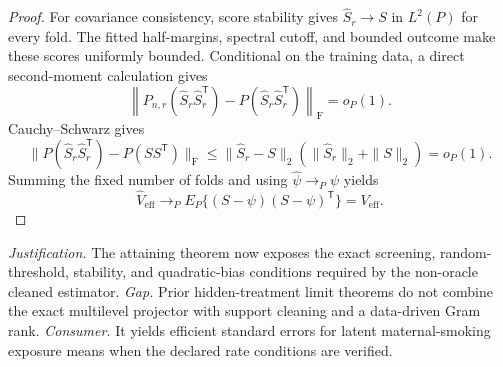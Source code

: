 \documentclass{article}
\begin{document}
\begin{proof}
For covariance consistency, score stability gives \(\widehat S_r\to S\) in \(L^2(P)\) for every fold.  The fitted half-margins, spectral cutoff, and bounded outcome make these scores uniformly bounded.  Conditional on the training data, a direct second-moment calculation gives
\[
 \left\|P_{n,r}(\widehat S_r\widehat S_r^{\mathsf T})
 -P(\widehat S_r\widehat S_r^{\mathsf T})\right\|_{\mathrm F}=o_P(1). \tag{62}
\]
Cauchy--Schwarz gives
\[
 \|P(\widehat S_r\widehat S_r^{\mathsf T})-P(SS^{\mathsf T})\|_{\mathrm F}
 \leq\|\widehat S_r-S\|_2(\|\widehat S_r\|_2+\|S\|_2)=o_P(1). \tag{63}
\]
Summing the fixed number of folds and using \(\widehat\psi\to_P\psi\) yields
\[
 \widehat V_{\mathrm{eff}}
 \to_P E_P\{(S-\psi)(S-\psi)^{\mathsf T}\}=V_{\mathrm{eff}}.
\]
\end{proof}
\par\smallskip\noindent \textit{Justification.} The attaining theorem now exposes the exact screening, random-threshold, stability, and quadratic-bias conditions required by the non-oracle cleaned estimator. \textit{Gap.} Prior hidden-treatment limit theorems do not combine the exact multilevel projector with support cleaning and a data-driven Gram rank. \textit{Consumer.} It yields efficient standard errors for latent maternal-smoking exposure means when the declared rate conditions are verified.
\end{document}
